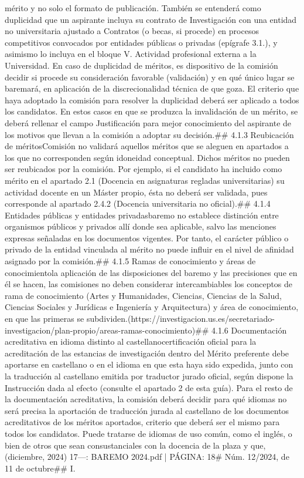 \documentclass{article}
\begin{document}
\begin{itemize}
{{{{{{mérito y no solo el formato de publicación. También se entenderá como duplicidad que un aspirante incluya su contrato de Investigación con una entidad no universitaria ajustado a Contratos (o becas, si procede) en procesos competitivos convocados por entidades públicas o privadas (epígrafe 3.1.), y asimismo lo incluya en el bloque V. Actividad profesional externa a la Universidad. En caso de duplicidad de méritos, es dispositivo de la comisión decidir si procede su consideración favorable (validación) y en qué único lugar se baremará, en aplicación de la discrecionalidad técnica de que goza. El criterio que haya adoptado la comisión para resolver la duplicidad deberá ser aplicado a todos los candidatos. En estos casos en que se produzca la invalidación de un mérito, se deberá rellenar el campo Justificación para mejor conocimiento del aspirante de los motivos que llevan a la comisión a adoptar su decisión.\n\n## 4.1.3 Reubicación de méritos\n\nLa Comisión no validará aquellos méritos que se aleguen en apartados a los que no corresponden según idoneidad conceptual. Dichos méritos no pueden ser reubicados por la comisión. Por ejemplo, si el candidato ha incluido como mérito en el apartado 2.1 (Docencia en asignaturas regladas universitarias) su actividad docente en un Máster propio, ésta no deberá ser validada, pues corresponde al apartado 2.4.2 (Docencia universitaria no oficial).\n\n## 4.1.4 Entidades públicas y entidades privadas\n\nEl baremo no establece distinción entre organismos públicos y privados allí donde sea aplicable, salvo las menciones expresas señaladas en los documentos vigentes. Por tanto, el carácter público o privado de la entidad vinculada al mérito no puede influir en el nivel de afinidad asignado por la comisión.\n\n## 4.1.5 Ramas de conocimiento y áreas de conocimiento\n\nPara la aplicación de las disposiciones del baremo y las precisiones que en él se hacen, las comisiones no deben considerar intercambiables los conceptos de rama de conocimiento (Artes y Humanidades, Ciencias, Ciencias de la Salud, Ciencias Sociales y Jurídicas e Ingeniería y Arquitectura) y área de conocimiento, en que las primeras se subdividen.(https://investigacion.us.es/secretariado-investigacion/plan-propio/areas-ramas-conocimiento)\n\n## 4.1.6 Documentación acreditativa en idioma distinto al castellano\n\nLa certificación oficial para la acreditación de las estancias de investigación dentro del Mérito preferente debe aportarse en castellano o en el idioma en que esta haya sido expedida, junto con la traducción al castellano emitida por traductor jurado oficial, según dispone la Instrucción dada al efecto (consulte el apartado 2 de esta guía). Para el resto de la documentación acreditativa, la comisión deberá decidir para qué idiomas no será precisa la aportación de traducción jurada al castellano de los documentos acreditativos de los méritos aportados, criterio que deberá ser el mismo para todos los candidatos. Puede tratarse de idiomas de uso común, como el inglés, o bien de otros que sean consustanciales con la docencia de la plaza y que,\n{} (diciembre, 2024) 17\n\n---\n\nFUENTE: BAREMO 2024.pdf | PÁGINA: 18\n# Núm. 12/2024, de 11 de octubre\n\n## I. }}}}}}
\end{itemize}
\end{document}

